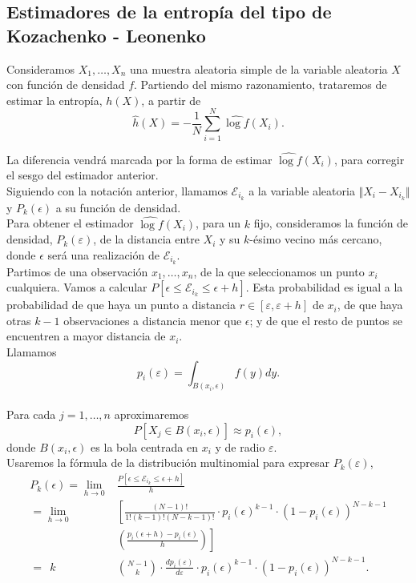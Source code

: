 \documentclass[12pt,a4paper]{report} %
\theoremstyle{definition}
\begin{document}
\subsection{Estimadores de la entropía del tipo de Kozachenko - Leonenko}

Consideramos $X_1,\dots, X_n$ una muestra aleatoria simple de la variable aleatoria $X$ con función de densidad $f$. Partiendo del mismo razonamiento, trataremos de estimar la entropía, $h(X)$, a partir de \[
\widehat{h}(X) = -\frac{1}{N}\sum_{i=1}^N\widehat{\log f}(X_i).\]

La diferencia vendrá marcada por la forma de estimar $\widehat{\log f}(X_i)$, para corregir el sesgo del estimador anterior.\\

Siguiendo con la notación anterior, llamamos $\mathcal{E}_{i_k}$ a la variable aleatoria $\Vert X_i - X_{i_k} \Vert$ y $P_k(\epsilon)$ a su función de densidad.\\

Para obtener el estimador $\widehat{\log f}(X_i)$, para un $k$ fijo, consideramos la función de densidad, $P_k(\varepsilon)$, de la distancia entre $X_i$ y su $k$-ésimo vecino más cercano, donde $\epsilon$ será una realización de $\mathcal{E}_{i_k}$.\\

Partimos de una observación $x_1,\dots, x_n$, de la que seleccionamos un punto $x_i$ cualquiera. Vamos a calcular $P\left[\epsilon \leq \mathcal{E}_{i_k} \leq \epsilon + h \right]$. Esta probabilidad es igual a la probabilidad de que haya un punto a distancia $r\in \left[ \varepsilon,\varepsilon + h \right ]$ de $x_i$, de que haya otras $k-1$ observaciones a distancia menor que $\epsilon$; y de que el resto de puntos se encuentren a mayor distancia de $x_i$.\\

Llamamos \[
p_i(\varepsilon) = \int_{B(x_i,\epsilon)}f(y)dy.
\]\\[-10pt]

Para cada $j = 1,\dots,n$ aproximaremos\[
P\left[X_j \in B(x_i,\epsilon)\right]\approx p_i(\epsilon),
\]donde $B(x_i,\epsilon)$ es la bola centrada en $x_i$ y de radio $\varepsilon$.\\

Usaremos la fórmula de la distribución multinomial para expresar $P_k(\varepsilon)$,
\begin{align*}
  P_k(\epsilon) = \lim_{h\to 0}&\frac{P\left[\epsilon \leq \mathcal{E}_{i_k} \leq \epsilon + h\right]}{h}\\[5pt] = \lim_{h\to 0}& \left [\frac{(N-1)!}{1!(k-1)!(N-k-1)!}  \cdot p_i(\epsilon)^{k-1} \cdot \left(1-p_i(\epsilon)\right)^{N-k-1} \right.\\[3pt] &\left.\left(\frac{p_i(\epsilon + h ) - p_i(\epsilon)}{h}\right)\right ]\\[5pt] = \ \  k\ \ &\binom{N-1}{k} \cdot \frac{d p_i(\varepsilon)}{d\varepsilon} \cdot p_i(\epsilon)^{k-1} \cdot \left(1-p_i(\epsilon)\right)^{N-k-1}.\\[-5pt]
\end{align*}
\end{document}
